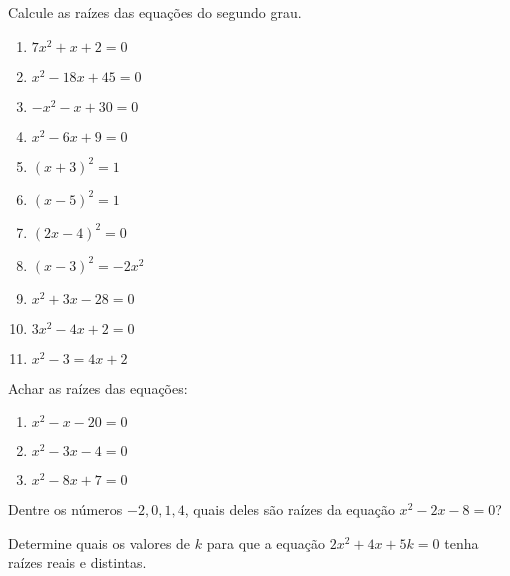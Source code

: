 	\item Calcule as raízes das equações do segundo grau.
	\begin{multicols}{3}
	\begin{enumerate}	
		\item $7x^2 + x + 2 = 0$
		\item $x^2 - 18x + 45 = 0$
		\item $-x^2 - x + 30 = 0$
		\item $x^2 - 6x + 9 = 0$
		\item $(x + 3)^2 = 1$
		\item $(x - 5)^2 = 1$
		\item $(2x - 4)^2 = 0$
		\item $(x - 3)^2 = -2x^2$
		\item $x^2 + 3x - 28 = 0$
		\item $3x^2 - 4x + 2 = 0$
		\item $x^2 - 3 = 4x + 2$
	\end{enumerate}
	\end{multicols}
		
	\item Achar as raízes das equações: 
		\begin{multicols}{3}
		\begin{enumerate}
		\item $x^2 - x - 20 = 0$
		\item $x^2 - 3x -4 = 0$
		\item $x^2 - 8x + 7 = 0$
		\end{enumerate} 
		\end{multicols}
	\item Dentre os números $-2, 0, 1, 4$, quais deles são raízes da equação $x^2-2x-8= 0$?
	\item Determine quais os valores de $k$ para que a equação $2x^2 + 4x + 5k = 0$ tenha raízes reais e distintas.	
	
